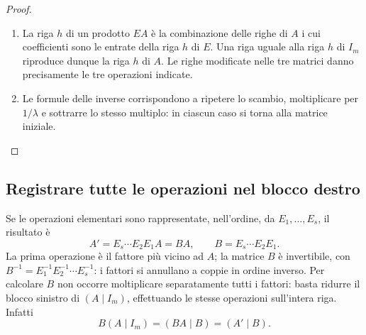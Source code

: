 \begin{proof}
\begin{enumerate}[label=\arabic*.]
\item La riga $h$ di un prodotto $EA$ è la combinazione delle righe di $A$ i cui coefficienti sono le entrate della riga $h$ di $E$. Una riga uguale alla riga $h$ di $I_m$ riproduce dunque la riga $h$ di $A$. Le righe modificate nelle tre matrici danno precisamente le tre operazioni indicate.
\item Le formule delle inverse corrispondono a ripetere lo scambio, moltiplicare per $1/\lambda$ e sottrarre lo stesso multiplo: in ciascun caso si torna alla matrice iniziale.
\end{enumerate}
\end{proof}

\subsection{Registrare tutte le operazioni nel blocco destro}
Se le operazioni elementari sono rappresentate, nell'ordine, da $E_1,\ldots,E_s$, il risultato è
\[
 A'=E_s\cdots E_2E_1A=BA,\qquad B=E_s\cdots E_2E_1.
\]
La prima operazione è il fattore più vicino ad $A$; la matrice $B$ è invertibile, con $B^{-1}=E_1^{-1}E_2^{-1}\cdots E_s^{-1}$: i fattori si annullano a coppie in ordine inverso. Per calcolare $B$ non occorre moltiplicare separatamente tutti i fattori: basta ridurre il blocco sinistro di $(A\mid I_m)$, effettuando le stesse operazioni sull'intera riga. Infatti
\[
 B(A\mid I_m)=(BA\mid B)=(A'\mid B).
\]
\begin{schema}
\end{schema}

